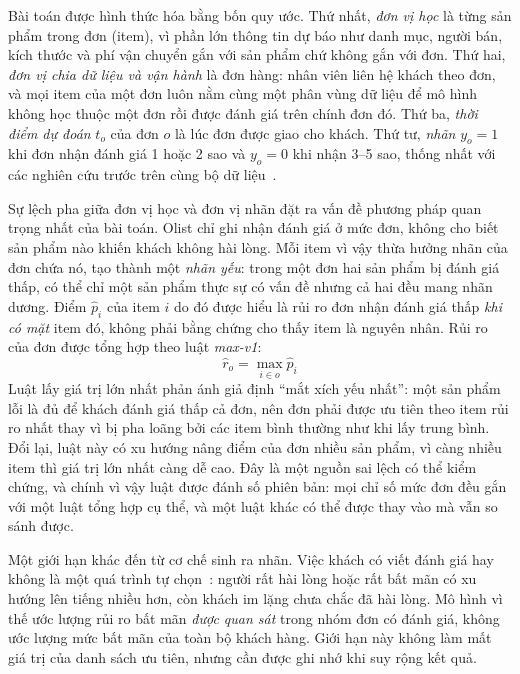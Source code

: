 Bài toán được hình thức hóa bằng bốn quy ước. Thứ nhất, \emph{đơn vị học} là từng sản phẩm trong đơn (item), vì phần lớn thông tin dự báo như danh mục, người bán, kích thước và phí vận chuyển gắn với sản phẩm chứ không gắn với đơn. Thứ hai, \emph{đơn vị chia dữ liệu và vận hành} là đơn hàng: nhân viên liên hệ khách theo đơn, và mọi item của một đơn luôn nằm cùng một phân vùng dữ liệu để mô hình không học thuộc một đơn rồi được đánh giá trên chính đơn đó. Thứ ba, \emph{thời điểm dự đoán} $t_o$ của đơn $o$ là lúc đơn được giao cho khách. Thứ tư, \emph{nhãn} $y_o = 1$ khi đơn nhận đánh giá 1 hoặc 2 sao và $y_o = 0$ khi nhận 3--5 sao, thống nhất với các nghiên cứu trước trên cùng bộ dữ liệu~\cite{orman2026}.

Sự lệch pha giữa đơn vị học và đơn vị nhãn đặt ra vấn đề phương pháp quan trọng nhất của bài toán. Olist chỉ ghi nhận đánh giá ở mức đơn, không cho biết sản phẩm nào khiến khách không hài lòng. Mỗi item vì vậy thừa hưởng nhãn của đơn chứa nó, tạo thành một \emph{nhãn yếu}: trong một đơn hai sản phẩm bị đánh giá thấp, có thể chỉ một sản phẩm thực sự có vấn đề nhưng cả hai đều mang nhãn dương. Điểm $\hat p_i$ của item $i$ do đó được hiểu là rủi ro đơn nhận đánh giá thấp \emph{khi có mặt} item đó, không phải bằng chứng cho thấy item là nguyên nhân. Rủi ro của đơn được tổng hợp theo luật \emph{max-v1}:
\begin{equation}\label{eq:maxv1}
  \hat{r}_o = \max_{i \in o} \hat{p}_i
\end{equation}
Luật lấy giá trị lớn nhất phản ánh giả định ``mắt xích yếu nhất'': một sản phẩm lỗi là đủ để khách đánh giá thấp cả đơn, nên đơn phải được ưu tiên theo item rủi ro nhất thay vì bị pha loãng bởi các item bình thường như khi lấy trung bình. Đổi lại, luật này có xu hướng nâng điểm của đơn nhiều sản phẩm, vì càng nhiều item thì giá trị lớn nhất càng dễ cao. Đây là một nguồn sai lệch có thể kiểm chứng, và chính vì vậy luật được đánh số phiên bản: mọi chỉ số mức đơn đều gắn với một luật tổng hợp cụ thể, và một luật khác có thể được thay vào mà vẫn so sánh được.

Một giới hạn khác đến từ cơ chế sinh ra nhãn. Việc khách có viết đánh giá hay không là một quá trình tự chọn~\cite{li2008}: người rất hài lòng hoặc rất bất mãn có xu hướng lên tiếng nhiều hơn, còn khách im lặng chưa chắc đã hài lòng. Mô hình vì thế ước lượng rủi ro bất mãn \emph{được quan sát} trong nhóm đơn có đánh giá, không ước lượng mức bất mãn của toàn bộ khách hàng. Giới hạn này không làm mất giá trị của danh sách ưu tiên, nhưng cần được ghi nhớ khi suy rộng kết quả.

